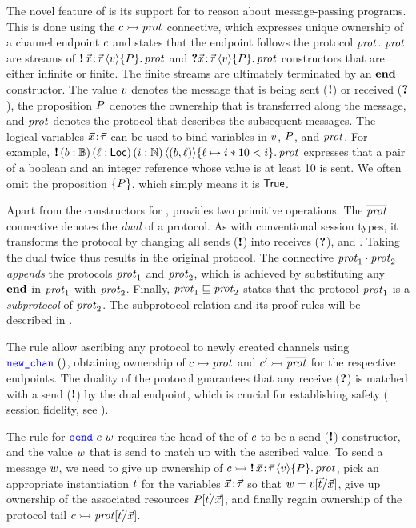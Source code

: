 The novel feature of \lname is its support for \pname to reason about
message-passing programs.
This is done using the $c \rightarrowtail \mathit{prot}$ connective, which expresses unique
ownership of a channel endpoint $c$ and states that the endpoint follows
the protocol $\mathit{prot}$.
\Pname $\mathit{prot}$ are streams of
$\sendprot {\xdots} \val \iprop \prot$ and
$\recvprot {\xdots} \val \iprop \prot$ constructors that are either infinite or finite.
The finite streams are ultimately terminated by an $\mathbf{end}$ constructor.
The value $v$ denotes the message that is being sent ($\textnormal{\bf !}$) or received
($\textnormal{\bf ?}$), the proposition $P$ denotes the ownership that is transferred
along the message, and $\mathit{prot}$ denotes the protocol that describes the subsequent
messages.
The logical variables $\vec{x}\!:\!\vec{\tau}$ can be used to bind variables in $v$, $P$,
and $\mathit{prot}$.
For example, $\sendprot{(b:\bool)\,(\loc:\Loc)\,(i:\nat)}{(b,\loc)}
  {\loc \mapsto i * 10 < i} \prot$ expresses that a pair of a boolean and an
integer reference whose value is at least 10 is sent.
We often omit the proposition ${\left\{P\right\}}$, which simply means it is
$\textsf{\upshape True}$.

Apart from the constructors for \pname, \lname provides two primitive
operations.
The $\overline{\mathit{prot}}$ connective denotes the \emph{dual} of a protocol.
As with conventional session types, it transforms the protocol by changing all
sends ($\textnormal{\bf !}$) into receives ($\textnormal{\bf ?}$), and \viceversa.
Taking the dual twice thus results in the original protocol.
The connective $\mathit{prot}_1 \cdot \mathit{prot}_2$ \emph{appends} the protocols $\mathit{prot}_1$
and $\mathit{prot}_2$, which is achieved by substituting any $\mathbf{end}$ in $\mathit{prot}_1$
with $\mathit{prot}_2$.
Finally, $\mathit{prot}_1 \sqsubseteq \mathit{prot}_2$ states that the
protocol $\mathit{prot}_1$ is a \emph{subprotocol} of $\mathit{prot}_2$.
The subprotocol relation and its proof rules will be described in
.

The rule  allow ascribing any protocol to newly created
channels using $\texttt{\color{blue} new\_chan}\ ()$, obtaining ownership of $c \rightarrowtail \mathit{prot}$ and
$c' \rightarrowtail \overline{\mathit{prot}}$ for the respective endpoints.
The duality of the protocol guarantees that any receive ($\textnormal{\bf ?}$) is matched with a
send ($\textnormal{\bf !}$) by the dual endpoint, which is crucial for establishing safety (\ie
session fidelity, see ).

The rule  for $\texttt{\color{blue} send}\ c\ w$ requires the head of the
\pnameSingular of $c$ to be a send ($\textnormal{\bf !}$) constructor, and
the value $w$ that is send to match up with the ascribed value.
To send a message $w$, we need to give up ownership of
$\interp{\chan}{\sendprot{\xdots}{\val}{\iprop}{\prot}}$,
pick an appropriate instantiation $\vec{t}$ for the variables
$\vec{x}\!:\!\vec{\tau}$ so that $w = {v}[{\vec{t}} / {\vec{x}}]$,
give up ownership of the associated resources ${P}[{\vec{t}} / {\vec {x}}]$,
and finally regain ownership of the protocol tail
$c \rightarrowtail {\mathit{prot}}[{\vec{t}} / {\vec{x}}]$.

